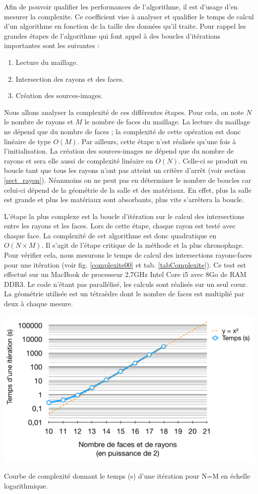 Afin de pouvoir qualifier les performances de l'algorithme, il est d'usage d'en mesurer la \gls{complexite}. Ce coefficient vise à analyser et qualifier le temps de calcul d'un algorithme en fonction de la taille des données qu'il traite. Pour rappel les grandes étapes de l'algorithme qui font appel à des boucles d'itérations importantes sont les suivantes :
\begin{enumerate}
\item Lecture du maillage.
\item Intersection des rayons et des faces.
\item Création des sources-images.
\end{enumerate}
Nous allons analyser la complexité de ces différentes étapes. Pour cela, on note $N$ le nom\-bre de rayons et $M$ le nombre de faces du maillage. La lecture du maillage ne dépend que du nombre de faces ; la complexité de cette opération est donc linéaire de type $O(M)$. Par ailleurs, cette étape n'est réalisée qu'une fois à l'initialisation. La création des sources-images ne dépend que du nombre de rayons et sera elle aussi de complexité linéaire en $O(N)$. Celle-ci se produit en boucle tant que tous les rayons n'ont pas atteint un critère d'arrêt (voir section \ref{sect_rayon}). Néanmoins on ne peut pas en déterminer le nombre de boucles car celui-ci dépend de la géométrie de la salle et des matériaux. En effet, plus la salle est grande et plus les matériaux sont absorbants, plus vite s'arrêtera la boucle. 

L'étape la plus complexe est la boucle d'itération sur le calcul des intersections entre les rayons et les faces. Lors de cette étape, chaque rayon est testé avec chaque face. La complexité de cet algorithme est donc quadratique en $O(N \times M)$. Il s'agit de l'étape critique de la méthode et la plus chronophage. Pour vérifier cela, nous mesurons le temps de calcul des intersections rayons-faces pour une itération (voir fig. \ref{complexite00} et tab. \ref{tabComplexite}). Ce test est effectué sur un MacBook de processeur 2,7GHz Intel Core i5 avec 8Go de RAM DDR3. Le code n'étant pas parallélisé, les calculs sont réalisés sur un seul c\oe{}ur. La géométrie utilisée est un tétraèdre dont le nombre de faces est multiplié par deux à chaque mesure.


 \begin{figureth}
	\includegraphics[width=0.8\linewidth]{images/complexite00}
	\caption{Courbe de complexité donnant le temps (s) d'une itération pour N=M en échelle logarithmique.}
	\label{complexite00}
\end{figureth}

